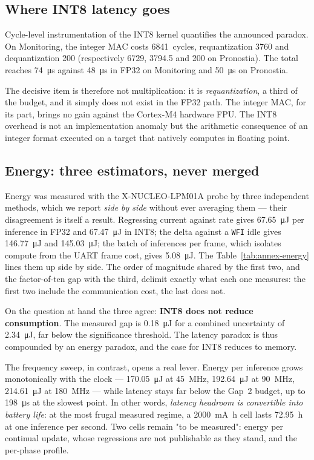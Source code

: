 \subsection{Where INT8 latency goes}

Cycle-level instrumentation of the INT8 kernel quantifies the announced paradox. On Monitoring, the integer
MAC costs \num{6841}~cycles, requantization \num{3760} and dequantization \num{200} (respectively
\num{6729}, \num{3794.5} and \num{200} on Pronostia). The total reaches \SI{74}{\micro\second} against
\SI{48}{\micro\second} in FP32 on Monitoring and \SI{50}{\micro\second} on Pronostia.

The decisive item is therefore not multiplication: it is \emph{requantization}, a third of the budget, and
it simply does not exist in the FP32 path. The integer MAC, for its part, brings no gain against the
Cortex-M4 hardware FPU. The INT8 overhead is not an implementation anomaly but the arithmetic consequence of
an integer format executed on a target that natively computes in floating point.

\subsection{Energy: three estimators, never merged}

Energy was measured with the X-NUCLEO-LPM01A probe by three independent methods, which we report
\emph{side by side} without ever averaging them --- their disagreement is itself a result. Regressing current
against rate gives \SI{67.65}{\micro\joule} per inference in FP32 and \SI{67.47}{\micro\joule} in INT8; the
delta against a \texttt{WFI} idle gives \SI{146.77}{\micro\joule} and \SI{145.03}{\micro\joule}; the batch of
inferences per frame, which isolates compute from the UART frame cost, gives \SI{5.08}{\micro\joule}. The
Table~\ref{tab:annex-energy} lines them up side by side. The
order of magnitude shared by the first two, and the factor-of-ten gap with the third, delimit exactly what
each one measures: the first two include the communication cost, the last does not.

On the question at hand the three agree: \textbf{INT8 does not reduce consumption}. The measured gap is
\SI{0.18}{\micro\joule} for a combined uncertainty of \SI{2.34}{\micro\joule}, far below the significance
threshold. The latency paradox is thus compounded by an energy paradox, and the case for INT8 reduces to
memory.

The frequency sweep, in contrast, opens a real lever. Energy per inference grows monotonically with the
clock --- \SI{170.05}{\micro\joule} at \SI{45}{\mega\hertz}, \SI{192.64}{\micro\joule} at
\SI{90}{\mega\hertz}, \SI{214.61}{\micro\joule} at \SI{180}{\mega\hertz} --- while latency stays far
below the Gap~2 budget, up to \SI{198}{\micro\second} at the slowest point. In other words,
\emph{latency headroom is convertible into battery life}: at the most frugal measured regime, a
\SI{2000}{\milli\ampere\hour} cell lasts \SI{72.95}{\hour} at one inference per second. Two cells remain
"to be measured": energy per continual update, whose regressions are not publishable as they stand, and
the per-phase profile.

